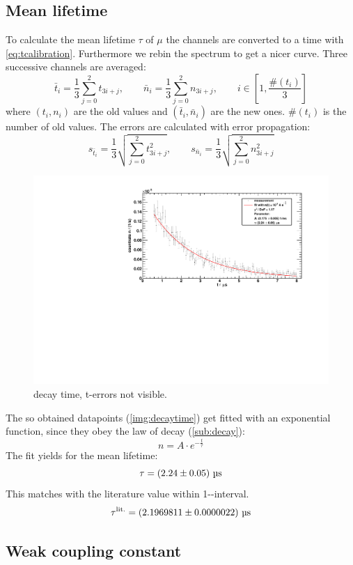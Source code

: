 \subsection{Mean lifetime}
To calculate the mean lifetime $\tau$ of $\mu$ the channels are converted to a time with \autoref{eq:tcalibration}. 
Furthermore we rebin the spectrum to get a nicer curve. Three successive channels are averaged:
\begin{equation}
    \bar{t}_i = \frac{1}{3} \sum_{j=0}^{2} t_{3i+j}, \qquad \bar{n}_i = \frac{1}{3} \sum_{j=0}^{2} n_{3i+j}, \qquad i \in \left[1, \frac{\#(t_i)}{3} \right]
\end{equation}
where $(t_i, n_i)$ are the old values and $(\bar{t}_i, \bar{n}_i)$ are the new ones. $\#(t_i)$ is the number of old values.
The errors are calculated with error propagation:
\begin{equation}
    s_{\bar{t}_i} = \frac{1}{3} \sqrt{\sum_{j=0}^{2} t_{3i+j}^2}, \qquad s_{\bar{n}_i} = \frac{1}{3} \sqrt{\sum_{j=0}^{2} n_{3i+j}^2}
\end{equation}
\begin{figure}[H]
\begin{center}
  \includegraphics[width=\textwidth]{../img/decayTime.pdf}
  \caption{decay time, t-errors not visible.}
  \label{img:decaytime}
\end{center}
\end{figure}

The so obtained datapoints (\autoref{img:decaytime}) get fitted with an exponential function, since they obey the law of decay (\ref{sub:decay}):
\begin{equation}
    n = A \cdot e^{-\frac{t}{\tau}}
\end{equation}
The fit yields for the mean lifetime:
\begin{equation}
    \tau = \left( 2.24 \pm 0.05 \right)\,\text{\textmu s}
\end{equation}
This matches with the literature value within 1-\textsigma-interval. %
\begin{equation}
    \tau^{\text{lit.}} = \left( 2.1969811 \pm 0.0000022 \right)\,\text{\textmu s}
\end{equation}

\subsection{Weak coupling constant}